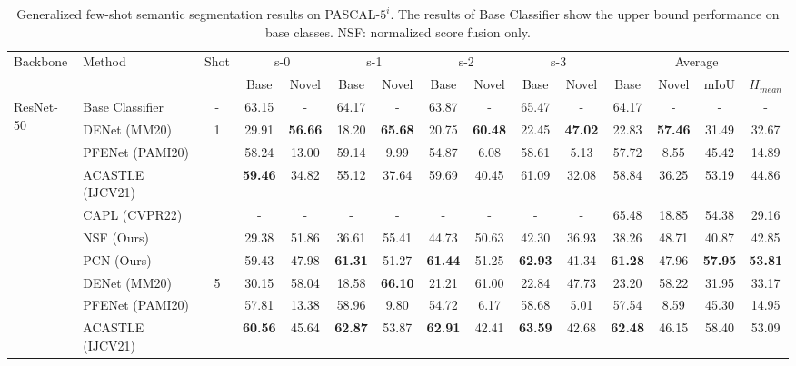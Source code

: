\documentclass[journal]{IEEEtran}
\begin{document}
\begin{table*}[ht]
    \centering
    \caption{Generalized few-shot semantic segmentation results on PASCAL-$5^{i}$. The results of Base Classifier show the upper bound performance on base classes. NSF: normalized score fusion only.}
\begin{adjustbox}{max width=\textwidth}
    \begin{tabular}{l|l|c|cccccccc|cccc}
    \hline
         \multirow{2}{*}{Backbone} & \multirow{2}{*}{Method} & \multirow{2}{*}{Shot} & \multicolumn{2}{c}{s-0} &  \multicolumn{2}{c}{s-1} &  \multicolumn{2}{c}{s-2} &  \multicolumn{2}{c}{s-3} & \multicolumn{4}{c}{Average}  \\
         \cline{4-15}
         & & & Base & Novel & Base & Novel & Base & Novel & Base & Novel & Base & Novel & mIoU & $H_{mean}$ \\
         \hline
         \multirow{11}{*}{ResNet-50} & Base Classifier & - & 63.15 & - & 64.17 & - & 63.87 & - & 65.47 & - & 64.17 & - & - & - \\
         \cline{3-15}
         & DENet (MM20) & \multirow{6}{*}{1} & 29.91 & \textbf{56.66} & 18.20 & \textbf{65.68} & 20.75 & \textbf{60.48} & 22.45 & \textbf{47.02} & 22.83 & \textbf{57.46} & 31.49 & 32.67 \\
         & PFENet (PAMI20) & & 58.24 & 13.00 & 59.14 & 9.99 & 54.87 & 6.08 & 58.61 & 5.13 & 57.72 & 8.55 & 45.42 & 14.89 \\
         & ACASTLE (IJCV21) & & \textbf{59.46} & 34.82 & 55.12 & 37.64 & 59.69 & 40.45 & 61.09 & 32.08 & 58.84 & 36.25 & 53.19 & 44.86 \\
         & CAPL (CVPR22) & & - & - & - & - & - & - & - & - & 65.48 & 18.85 & 54.38 & 29.16 \\
         & NSF (Ours) & & 29.38 & 51.86 & 36.61 & 55.41 & 44.73 & 50.63 & 42.30 & 36.93 & 38.26 & 48.71 & 40.87 & 42.85 \\
         & PCN (Ours) & & 59.43 & 47.98 & \textbf{61.31} & 51.27 & \textbf{61.44} & 51.25 & \textbf{62.93} & 41.34 & \textbf{61.28} & 47.96 & \textbf{57.95} & \textbf{53.81} \\
         \cline{2-15}
         & DENet (MM20) & \multirow{6}{*}{5} & 30.15 & 58.04 & 18.58 & \textbf{66.10} & 21.21 & 61.00 & 22.84 & 47.73 & 23.20 & 58.22 & 31.95 & 33.17 \\
         & PFENet (PAMI20) & & 57.81 & 13.38 & 58.96 & 9.80 & 54.72 & 6.17 & 58.68 & 5.01 & 57.54 & 8.59 & 45.30 & 14.95 \\
         & ACASTLE (IJCV21) & & \textbf{60.56} & 45.64 & \textbf{62.87} & 53.87 & \textbf{62.91} & 42.41 & \textbf{63.59} & 42.68 & \textbf{62.48} & 46.15 & 58.40 & 53.09 \\

\end{tabular}
\end{adjustbox}
\end{table*}
\end{document}
